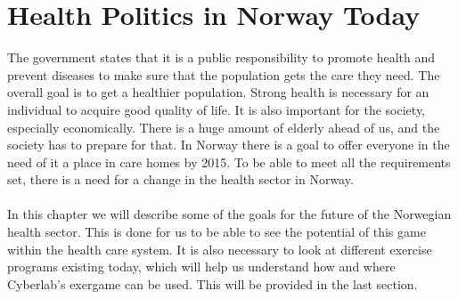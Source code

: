 \chapter{Health Politics in Norway Today}
The government states that it is a public responsibility to promote health and prevent diseases to make sure that the population gets the care they need. The overall goal is to get a healthier population. Strong health is necessary for an individual to acquire good quality of life. It is also important for the society, especially economically. There is a huge amount of elderly ahead of us, and the society has to prepare for that. In Norway there is a goal to offer everyone in the need of it a place in care homes by 2015.  To be able to meet all the requirements set, there is a need for a change in the health sector in Norway.\\ \\
In this chapter we will describe some of the goals for the future of the Norwegian health sector. This is done for us to be able to see the potential of this game within the health care system.  It is also necessary to look at different exercise programs existing today, which will help us understand how and where Cyberlab's exergame can be used. This will be provided in the last section. 

